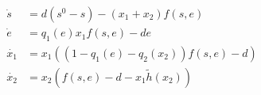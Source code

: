 \documentclass[12pt]{article}
\begin{document}
\begin{align}
\dot{s}&=d(s^0-s)-(x_1 + x_2) f(s,e) \label{tildes}\\
\dot{e}&=q_1(e) x_1 f(s,e)-de\\
\dot{x_1} &= x_1((1-q_1(e)-q_2(x_2))f(s,e)-d)\\
\dot{x_2}&=x_2(f(s,e)-d-x_1 \tilde{h}(x_2))\label{tildef}
\end{align}





\begin{comment}

\noindent Notice that \textbf{N1} implies that $h(0)=h_1((1-q_1)s^0)=0$, and that $h_1(x_1)>0$ when $0<x_1<(1-q_1)s^0$.

\noindent Further assume \textbf{N3: } The function $h_1(x_1)$ is strictly concave down (i.e. $h''(x_1)<0$ for $0<x_1<(1-q_1)s^0$), and the equation $h(x_1)= d/ (1-q_1)$ has exactly two positive solutions $x_1^u$ and $x_1^s$ with $x_1^u<x_1^s$.

\textbf{Lemma 1: } \textit{Assume that \textbf{N1, N2} and \textbf{N3} holds. Then equation (\ref{x1only}) has 3 steady states, $0, x_1^u$ and $x_1^s$. The steady states $0$ and $x_1^s$ are asymptotically stable, and $x_1^u$ is unstable.}

\begin{proof}
The linearization at a steady state of \ref{x1only} is given by: 
\begin{align*}
J=\bigg((1-q_1)[h_1(x_1)+x_1h_1'(x_1)]-d \bigg)
\end{align*}
The determinant of the Jacobian is simply the only entry, so $$\det{(J)}=(1-q_1)[h_1(x_1)+x_1h_1'(x_1)]-d.$$ 
Calculating $\det{(J)}$ at each steady state reveals the stability of each. 

\noindent For $x_1=0$, $\det{(J)}=-d<0$, thus, $x_1=0$ is stable. 

\noindent Note that for $x_1^u$ and $x_1^s$, $h_1(x_1)=d/1-q_1$. Thus $\det{J}=(1-q_1)x_1h'(x_1^u)]$. For $x_1^u$, $h'(x_1^u)>0$, thus, $det{J}>0$ and must have a positive eigenvalue, implying that it is an unstable state. For $x_1^s$, $h'(x_1^s)<0$, and it is thus a stable point.  
\end{proof}

These boundary steady states are also steady states of the full system, thus, for $x_2=0$, we have the steady states of $(s,x_1,x_2)$ as $W=(0,0,0)$, $C_u=(s^u, x_1^u, 0)$ and $C_s=(s^s, x_1^s, 0)$. 

\pagebreak


\end{comment}
\end{document}
